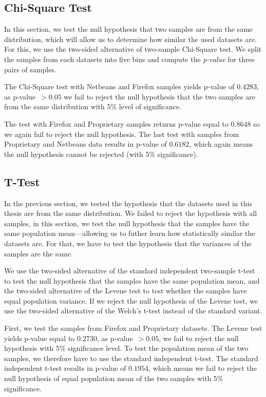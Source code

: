 \subsection{Chi-Square Test}

In this section, we test the null hypothesis that two samples are from the same distribution, which will allow us to determine how similar the used datasets are. For this, we use the two-sided alternative of two-sample Chi-Square test. We split the samples from each datasets into five bins and compute the \textit{p-value} for three pairs of samples.

The Chi-Square test with Netbeans and Firefox samples yields p-value of $0.4283$, as p-value~$> 0.05$ we fail to reject the null hypothesis that the two samples are from the same distribution with 5\% level of significance.

The test with Firefox and Proprietary samples returns p-value equal to $0.8648$ so we again fail to reject the null hypothesis. The last test with samples from Proprietary and Netbeans data results in p-value of $0.6182$, which again means the null hypothesis cannot be rejected (with 5\% significance).

\subsection{T-Test}

In the previous section, we tested the hypothesis that the datasets used in this thesis are from the same distribution. We failed to reject the hypothesis with all samples, in this section, we test the null hypothesis that the samples have the same population mean---allowing us to futher learn how statistically similar the datasets are. For that, we have to test the hypothesis that the variances of the samples are the same.

We use the two-sided alternative of the standard independent two-sample t-test to test the null hypothesis that the samples have the same population mean, and the two-sided alternative of the Levene test to test whether the samples have equal population variance. If we reject the null hypothesis of the Levene test, we use the two-sided alternative of the Welch's t-test instead of the standard variant.

First, we test the samples from Firefox and Proprietary datasets. The Levene test yields p-value equal to $0.2730$, as p-value~$> 0.05$, we fail to reject the null hypothesis with 5\% significance level. To test the population mean of the two samples, we therefore have to use the standard independent t-test. The standard independent t-test results in p-value of $0.1954$, which means we fail to reject the null hypothesis of equal population mean of the two samples with 5\% significance.

